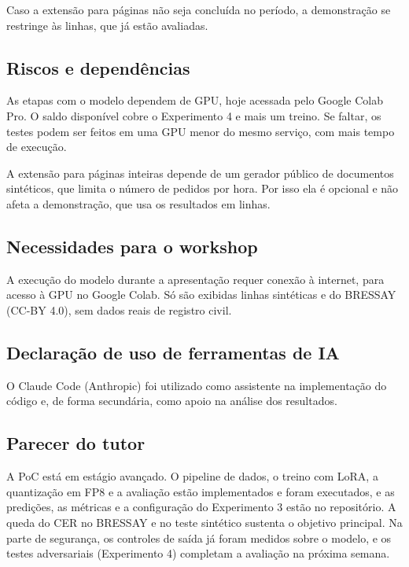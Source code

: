 \documentclass[12pt,a4paper]{article}
\begin{document}
Caso a extensão para páginas não seja concluída no período, a demonstração se restringe às linhas, que já estão avaliadas.

\subsection*{Riscos e dependências}

As etapas com o modelo dependem de GPU, hoje acessada pelo Google Colab Pro. O saldo disponível cobre o Experimento 4 e mais um treino. Se faltar, os testes podem ser feitos em uma GPU menor do mesmo serviço, com mais tempo de execução.

A extensão para páginas inteiras depende de um gerador público de documentos sintéticos, que limita o número de pedidos por hora. Por isso ela é opcional e não afeta a demonstração, que usa os resultados em linhas.

\subsection*{Necessidades para o workshop}

A execução do modelo durante a apresentação requer conexão à internet, para acesso à GPU no Google Colab. Só são exibidas linhas sintéticas e do BRESSAY (CC-BY 4.0), sem dados reais de registro civil.

\subsection*{Declaração de uso de ferramentas de IA}

O Claude Code (Anthropic) foi utilizado como assistente na implementação do código e, de forma secundária, como apoio na análise dos resultados.

\subsection*{Parecer do tutor}

A PoC está em estágio avançado. O pipeline de dados, o treino com LoRA, a quantização em FP8 e a avaliação estão implementados e foram executados, e as predições, as métricas e a configuração do Experimento 3 estão no repositório. A queda do CER no BRESSAY e no teste sintético sustenta o objetivo principal. Na parte de segurança, os controles de saída já foram medidos sobre o modelo, e os testes adversariais (Experimento 4) completam a avaliação na próxima semana.
\end{document}
